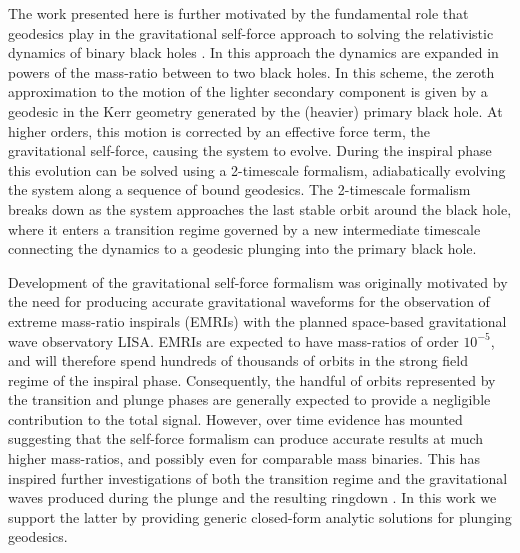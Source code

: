 \documentclass[12pt, amsmath]{revtex4-2}
\begin{document}
The work presented here is further motivated by the fundamental role that geodesics play in the gravitational self-force approach to solving the relativistic dynamics of binary black holes \cite{Barack:2018yvs}. In this approach the  dynamics are expanded in powers of the mass-ratio between to two black holes. In this scheme, the zeroth approximation to the motion of the lighter secondary component is given by a geodesic in the Kerr geometry generated by the (heavier) primary black hole. At higher orders, this motion is corrected by an effective force term, the gravitational self-force, causing the system to evolve.
During the inspiral phase this evolution can be solved using a 2-timescale formalism\cite{Hinderer:2008dm,
Pound:2021qin, Miller:2020bft}, adiabatically evolving the system along a sequence of bound geodesics. The 2-timescale formalism breaks down as the system approaches the last stable orbit around the black hole, where it enters a transition regime governed by a new intermediate timescale \cite{Buonanno:2000ef, Ori:2000zn, OShaughnessy:2002tbu, Sperhake:2007gu} connecting the dynamics to a geodesic plunging into the primary black hole.

Development of the gravitational self-force formalism was originally motivated by the need for producing accurate gravitational waveforms for the observation of extreme mass-ratio inspirals (EMRIs) with the planned space-based gravitational wave observatory LISA. EMRIs are expected to have mass-ratios of order $10^{-5}$, and will therefore spend hundreds of thousands of orbits in the strong field regime of the inspiral phase. Consequently, the handful of orbits represented by the transition and plunge phases are generally expected to provide a negligible contribution to the total signal. However, over time evidence has mounted
\cite{LeTiec:2011bk,Sperhake:2011ik,LeTiec:2011dp,Nagar:2013sga,LeTiec:2013uey,LeTiec:2017ebm,vandeMeent:2016hel,vandeMeent:2020xgc,Wardell:2021fyy,Ramos-Buades:2022lgf} suggesting that the self-force formalism can produce accurate results at much higher mass-ratios, and possibly even for comparable mass binaries. This has inspired further investigations of both the transition regime \cite{Compere:2021zfj,   Apte:2019txp,Burke:2019yek, Compere:2019cqe, Compere:2021iwh, Compere:2021zfj} and the gravitational waves produced during the plunge and the resulting ringdown \cite{Folacci:2018cic, Hughes:2019zmt, Lim:2019xrb}. In this work we support the latter by providing generic closed-form analytic solutions for plunging geodesics.
\end{document}
